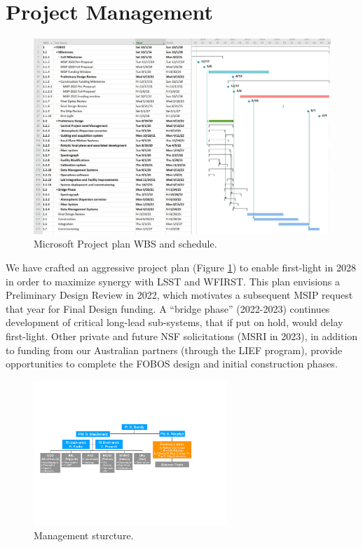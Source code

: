 \documentclass[oneside,11pt]{amsart}
\begin{document}
\section{Project Management}

\begin{figure}[h!]
%
\vskip -0.1in
%
\includegraphics[width=\textwidth]{figs/Pre-Proposal_Project_figure.jpg}
%
\caption{\small Microsoft Project plan WBS and schedule.}
%
\label{fig:gantt}
%
\end{figure}


We have crafted an aggressive project plan (Figure \ref{fig:gantt}) to enable first-light in 2028 in order to maximize
synergy with LSST and WFIRST.  This plan envisions a Preliminary Design Review in 2022, which motivates a subsequent
MSIP request that year for Final Design funding.  A ``bridge phase'' (2022-2023) continues development of critical
long-lead sub-systems, that if put on hold, would delay first-light.  Other private and future NSF solicitations (MSRI
in 2023), in addition to funding from our Australian partners (through the LIEF program), provide opportunities to
complete the FOBOS design and initial construction phases.


\begin{figure}\small
%
\includegraphics[width=0.65\textwidth]{figs/org_chart_v1.pdf}
%
\caption{Management sturcture.}
%
\label{fig:org}
%
\end{figure}
\end{document}
